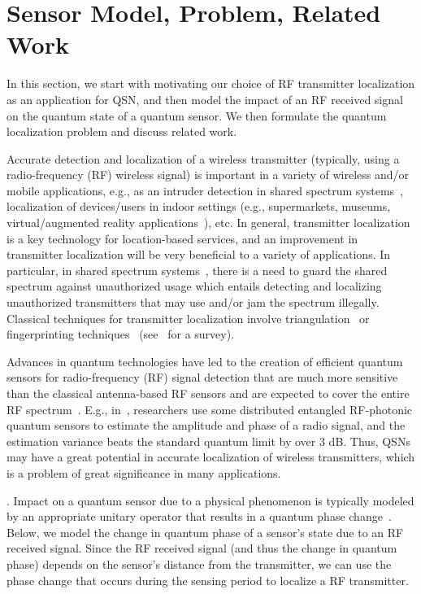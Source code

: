 \section{Sensor Model, Problem, Related Work}
\label{sec:quantum_problem}

In this section, we start with motivating our choice of RF transmitter localization as an application for QSN, and then model the impact of an RF received signal on the quantum state of a quantum sensor. We then formulate the quantum localization problem and discuss related work.

Accurate detection and localization of a wireless transmitter 
(typically, using a radio-frequency (RF) wireless signal) is important in a 
variety of wireless and/or mobile
applications, e.g.,
as an intruder detection in shared spectrum systems~\cite{infocom18-spectrum}, localization of devices/users in
indoor settings (e.g., supermarkets, museums, virtual/augmented reality applications~\cite{sigcomm22-cyclops}), 
etc. In general,
transmitter localization is a key technology for location-based services, and an 
improvement in transmitter localization will be very
beneficial to a variety of applications.
In particular, 
in shared spectrum systems~\cite{infocom18-spectrum}, there is a need to guard the shared spectrum
against unauthorized usage which entails detecting and localizing unauthorized transmitters that may
use and/or jam the spectrum illegally.
Classical techniques for transmitter localization involve triangulation~\cite{nsdi13-arraytrack} or fingerprinting techniques~\cite{infocom00-radar} (see~\cite{localization-survey} for a survey).

Advances in quantum technologies have led to the creation of efficient quantum sensors for
radio-frequency (RF) signal detection that are much more sensitive than the classical 
antenna-based RF sensors and are expected to cover the entire 
RF spectrum~\cite{PhysRevApplied.rydberg}. 
E.g., in~\cite{PRL20-qsn},
researchers use some distributed entangled RF-photonic quantum
sensors to estimate the amplitude and phase of a radio
signal, and the estimation variance beats the standard quantum
limit by over 3 dB. 
Thus, QSNs may have a great potential in accurate localization of wireless 
transmitters, which is a problem of great significance in many applications.

. 
Impact on a quantum sensor due to a physical phenomenon is typically modeled by an appropriate unitary operator that results in a quantum phase change~\cite{RevModPhys.quantumsensing}. Below, we model the change in quantum phase
of a sensor's state due to an RF received signal. 
Since the RF received signal (and thus the change in quantum phase) depends on the sensor's distance 
from the transmitter, we can use the phase change that occurs 
during the sensing period to localize a RF transmitter.

